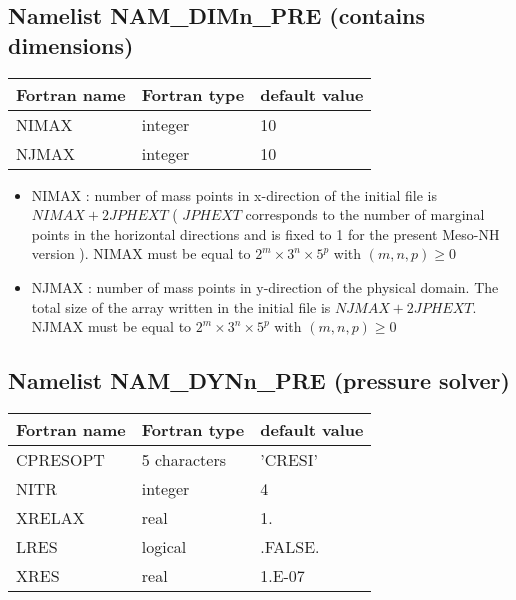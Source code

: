 \subsection{Namelist NAM\_DIMn\_PRE (contains  dimensions) }

\begin{center}
\begin{tabular} {|l|l|l|}
\hline
Fortran name & Fortran type & default value \\
\hline
NIMAX & integer & 10 \\
NJMAX & integer & 10 \\
\hline
\end{tabular}
\end{center}

\begin{itemize} 
\item NIMAX : number of mass points in x-direction of the 
initial file is $NIMAX +2 JPHEXT$ ( $JPHEXT$ corresponds to the number of
marginal points in the horizontal directions and is fixed to 1 for the present 
Meso-NH version ). NIMAX must be equal to $2^m \times 3^n \times 5^p$ with $(m,n,p) \ge 0$

\item NJMAX : number of mass points in y-direction of the 
physical domain. The total size of the array written in the initial
file is $NJMAX +2 JPHEXT$. NJMAX must be equal to $2^m \times 3^n \times 5^p$ with $(m,n,p) \ge 0$


\end{itemize}


\subsection{Namelist NAM\_DYNn\_PRE (pressure solver)} 

\begin{center}
\begin{tabular} {|l|l|l|}
\hline
Fortran name & Fortran type & default value \\
\hline
CPRESOPT    &  5 characters  & 'CRESI'  \\
NITR        &   integer      &  4      \\
XRELAX      &    real        &  1.   \\
LRES        & logical        & .FALSE. \\
XRES        & real           & 1.E-07  \\
\hline
\end{tabular}
\end{center}


